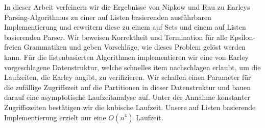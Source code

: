 \documentclass[11pt,
               a4paper,
               bibtotoc,
               idxtotoc,
               headsepline,
               footsepline,
               footexclude,
               BCOR12mm,
               DIV13,
               openany,   %
               oneside    %
               ]
               {scrbook}
\newtheorem{theorem}{Theorem}
\begin{document}
In dieser Arbeit verfeinern wir die Ergebnisse von Nipkow und Rau zu Earleys Parsing-Algorithmus zu einer auf  Listen basierenden ausführbaren Implementierung und erweitern diese zu einem auf Sets und einem auf Listen basierenden Parser.
Wir beweisen Korrektheit und Termination für alle Epsilon-freien Grammatiken und geben Vorschläge, wie dieses Problem gelöst werden kann.
Für die listenbasierten Algorithmen implementieren wir eine von Earley vorgeschlagene Datenstruktur, welche schnelles item nachschlagen erlaubt, um die Laufzeiten, die Earley angibt, zu verifizieren.
Wir schaffen einen Parameter für die zufällige Zugriffszeit auf die Partitionen in dieser Datenstruktur und bauen darauf eine asymptotische Laufzeitanalyse auf. Unter der Annahme konstanter Zugriffszeiten bestätigen wir die kubische Laufzeit. Unsere auf Listen basierende Implementierung erzielt nur eine $O(n^4)$ Laufzeit.

\cleardoublepage


\tableofcontents
\thispagestyle{empty}
\cleardoubleemptypage




%

\mainmatter






\end{document}

